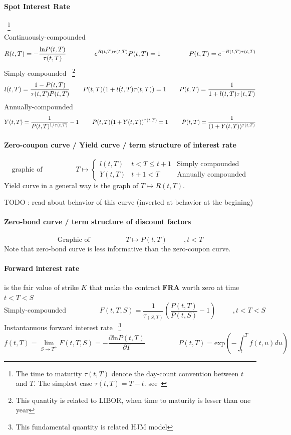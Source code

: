 \documentclass[a4paper,10pt]{article}
\newcommand{\RtT}{R(t,T)}
\newcommand{\PtT}{P(t,T)}
\newcommand{\PtS}{P(t,S)}
\newcommand{\LtT}{l(t,T)}
\newcommand{\YtT}{Y(t,T)}
\newcommand{\ftT}{f(t,T)}
\newcommand{\tautT}{\tau(t,T)}
\newcommand{\inttT}{\int_t^T}
\newcommand{\FuncExp}{\text{exp}}
\newcommand{\FuncLn}{\text{ln}}
\newcommand{\todo}[1]{\begin{center}\color{red} TODO : #1\end{center}}
\begin{document}
\paragraph{Spot Interest Rate}~\footnote{The time to maturity $\tautT$ denote the day-count convention between $t$ and $T$. The simplest case $\tautT=T-t$. see~\cite{PICARDO2014} }\\
Continuously-compounded 
\[
R(t,T) = -\frac{\FuncLn\PtT }{\tautT}
\hspace{1.5cm}
e^{\RtT\tautT}\PtT = 1
\hspace{1.5cm}
\PtT = e^{-\RtT\tautT}
\]
Simply-compounded ~\footnote{This quantity is related to LIBOR, when time to maturity is lesser than one year} 
\[
\LtT = \frac{1-\PtT}{\tautT\PtT}
\hspace{0.7 cm}
\PtT(1+\LtT\tautT)=1
\hspace{0.7cm}
\PtT = \frac{1}{1+\LtT\tautT}
\]
Annually-compounded
\[
\YtT = \frac{1}{\PtT^{1/\tautT}} -1
\hspace{0.8cm}
\PtT(1+\YtT)^{\tautT} = 1
\hspace{0.8cm}
\PtT = \frac{1}{(1+\YtT)^{\tautT}}
\]

\paragraph{Zero-coupon curve / Yield curve / term structure of interest rate}
\[
\text{graphic of}
\hspace{2cm}
T \longmapsto
\left\{
\begin{array}{lll}
\LtT  &  t < T \leq t+1 & \text{Simply compounded} \\
\YtT  &  t+1 < T        & \text{Annually compounded} 
\end{array}
\right.
\]
Yield curve in a general way is the graph of $T \longmapsto \RtT$.
\todo{read about behavior of this curve (inverted at behavior at the begining)}
\paragraph{Zero-bond curve / term structure of discount factors}
\[
\text{Graphic of }
\hspace{2cm}
T \longmapsto \PtT
\hspace{1cm}
,t<T
\]
Note that zero-bond curve is less informative than the zero-coupon curve.
\paragraph{Forward interest rate} is the fair value of strike $K$ that make the contract \textbf{FRA} worth zero at time $t<T<S$  
\[
\text{Simply-compounded}
\hspace{2cm}
F(t,T,S) = \frac{1}{ \tau_{(S,T)} }\left( \frac{\PtT}{\PtS} - 1 \right)
\hspace{1cm}
,t<T<S
\]
Instantanuous forward interest rate ~\footnote{This fundamental quantity is related HJM model}
\[
\ftT = \lim_{S\rightarrow T^+} F(t,T,S) = -\frac{\partial \FuncLn\PtT}{\partial T}
\hspace{2cm}
\PtT = \FuncExp\left( -\inttT f(t,u)du \right)
\]
\end{document}
